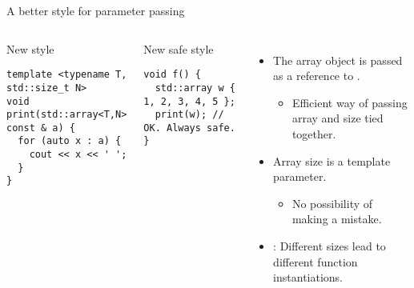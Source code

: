 \begin{frame}[t,fragile]{A better style for parameter passing}

\begin{columns}[T]

\begin{block}{New style}
\begin{lstlisting}
template <typename T, std::size_t N>
void print(std::array<T,N> const & a) {
  for (auto x : a) {
    cout << x << ' ';
  }
}
\end{lstlisting}
\end{block}

\begin{block}{New safe style}
\begin{lstlisting}
void f() {
  std::array w { 1, 2, 3, 4, 5 };
  print(w); // OK. Always safe.
}

\end{lstlisting}
\end{block}

\begin{itemize}
  \item The array object is passed as a reference to .
    \begin{itemize}
      \item Efficient way of passing array and size tied together.
    \end{itemize}

  \item Array size is a template parameter.
    \begin{itemize}
      \item No possibility of making a mistake.
    \end{itemize}

  \item {}: Different sizes lead to different function
        instantiations.
\end{itemize}

\end{columns}
\end{frame}
